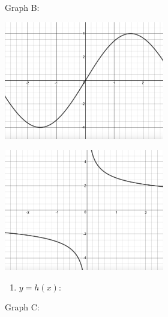\begin{center}
\begin{multicols}{2}
\begin{enumerate}
\setcounter{HW}{\value{enumi}}
\end{enumerate}

Graph B:

\end{multicols}




\begin{multicols}{2}

\includegraphics[width=2.75in]{./IntroductiontoDerivativesGraphics/MatchFunc06.jpeg}

\includegraphics[width=2.75in]{./IntroductiontoDerivativesGraphics/MatchDeriv04.jpeg}

\end{multicols}



\begin{multicols}{2}

\begin{enumerate}
\setcounter{enumi}{\value{HW}}

\item \label{MatchFcnDerivative2last}  $y = h(x)$:

\setcounter{HW}{\value{enumi}}
\end{enumerate}

Graph C:

\end{multicols}



\begin{multicols}{2}


\end{multicols}
\end{center}
